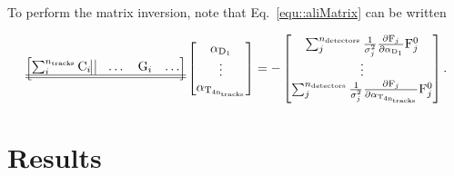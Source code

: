 To perform the matrix inversion, note that Eq.~\ref{equ::aliMatrix} can be
written

\begin{equation}
  \begin{bmatrix}
    \sum_i^{n_{\mathrm{tracks}}} \mathrm{C}_i \vline \; \vline
    & \dots &
    \mathrm{G}_i & \dots \\
    \hline \hline
  \end{bmatrix}
  \begin{bmatrix}
    \alpha_{\mathrm{D_1}} \\ \vdots \\ \alpha_{\mathrm{T_{4\mathrm{n}_{\mathrm{tracks}}}}}
  \end{bmatrix}
  = -
  \begin{bmatrix}
    \sum_j^{n_{\mathrm{detectors}}} \frac{1}{\sigma^2_j}\frac{\partial \mathrm{F}_j}{\partial
      \alpha_{\mathrm{D_1}}} \mathrm{F}_j^0 \\ \vdots \\ \sum_j^{n_{\mathrm{detectors}}}
    \frac{1}{\sigma^2_j}\frac{\partial \mathrm{F}_j}{\partial
      \alpha_{\mathrm{T_{4\mathrm{n}_{\mathrm{tracks}}}}}} \mathrm{F}_j^0
  \end{bmatrix}.
\end{equation}

\section{Results}


